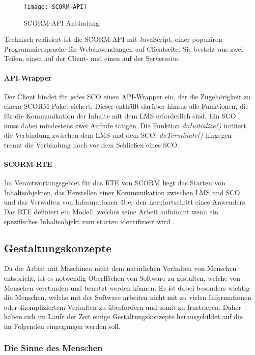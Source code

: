 \begin{figure}[ht]
\centering
\texttt{[image: SCORM-API]}
\caption{SCORM-API Anbindung\footnotemark}\label{pic:scormApi}
\end{figure}

Technisch realisiert ist die SCORM-API mit JavaScript, einer populären
Programmiersprache für Webanwendungen auf Clientseite. Sie besteht aus
zwei Teilen, einen auf der Client- und einen auf der Serverseite.

\paragraph{API-Wrapper}
Der Client bindet für jedes SCO einen API-Wrapper ein, der die Zugehörigkeit zu
einem SCORM-Paket sichert. Dieser enthällt darüber hinaus alle Funktionen, die
für die Kommunikation der Inhalte mit dem LMS erforderlich sind.
Ein SCO muss dabei mindestens zwei Aufrufe tätigen. Die Funktion
\textit{doInitialize()} initiiert die Verbindung zwischen dem LMS und dem SCO,
\textit{doTerminate()} hingegen trennt die Verbindung noch vor dem Schließen
eines SCO.

\paragraph{SCORM-RTE}
Im Verantwortungsgebiet für das \ac{RTE} von SCORM liegt das Starten von
Inhaltsobjekten, das Herstellen einer Kommunikation zwischen LMS und SCO und das
Verwalten von Informationen über den Lernfortschritt eines Anwenders. Das RTE
definiert ein Modell, welches seine Arbeit aufnimmt wenn ein spezifisches
Inhaltsobjekt zum starten identifiziert wird \cite{adl:2009}.

\subsection{Gestaltungskonzepte}
Da die Arbeit mit Maschinen nicht dem natürlichen Verhalten von Menschen entspricht, 
ist es notwendig Oberflächen von Software zu gestalten, welche von Menschen verstanden und benutzt werden können. 
Es ist dabei besonders wichtig die Menschen, welche mit der Software arbeiten
nicht mit zu vielen Informationen oder 4kompliziertem Verhalten zu überfordern und somit zu frustrieren.
Daher haben sich im Laufe der Zeit einige Gestaltungskonzepte herausgebildet auf die im Folgenden eingegangen werden soll. 

\subsubsection{Die Sinne des Menschen}

